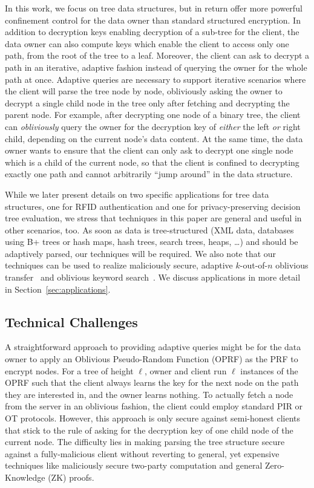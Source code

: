 In this work, we focus on tree data structures, but in return offer
more powerful confinement control for the data owner than standard
structured encryption.  In addition to decryption keys enabling
decryption of a sub-tree for the client, the data owner can also
compute keys which enable the client to access only one path, from the
root of the tree to a leaf.  Moreover, the client can ask to decrypt a
path in an iterative, adaptive fashion instead of querying the owner
for the whole path at once. Adaptive queries are necessary to support
iterative scenarios where the client will parse the tree node by node,
obliviously asking the owner to decrypt a single child node in the
tree only after fetching and decrypting the parent node.  For example,
after decrypting one node of a binary tree, the client can
\emph{obliviously} query the owner for the decryption key of
\emph{either} the left \emph{or} right child, depending on the current
node's data content.  At the same time, the data owner wants to ensure
that the client can only ask to decrypt one single node which is a
child of the current node, so that the client is confined to
decrypting exactly one path and cannot arbitrarily ``jump around'' in
the data structure.

 While we later present details on two specific applications for tree data structures, one for
RFID authentication and one for privacy-preserving decision tree
evaluation, we stress that techniques in this paper are general and
useful in other scenarios, too. As soon as data is tree-structured
(XML data, databases using B+ trees or hash maps, hash trees, search
trees, heaps, \ldots) and should be adaptively parsed, our techniques
will be required. We also note that our techniques can be used to
realize maliciously secure, adaptive $k$-out-of-$n$ oblivious
transfer~\cite{adaptiveot} and oblivious keyword search~\cite{oks}. We
discuss applications in more detail in Section~\ref{sec:applications}.

\subsection{Technical Challenges} A straightforward approach to
providing adaptive queries might be for the data owner to apply an
Oblivious Pseudo-Random Function (OPRF) as the PRF to encrypt nodes.
For a tree of height $\ell$, owner and client run $\ell$ instances of
the OPRF such that the client always learns the key for the next node
on the path they are interested in, and the owner learns nothing. To
actually fetch a node from the server in an oblivious fashion, the
client could employ standard PIR or OT protocols. However, this
approach is only secure against semi-honest clients that stick to the
rule of asking for the decryption key of one child node of the current
node. The difficulty lies in making parsing the tree structure secure
against a fully-malicious client without reverting to general, yet
expensive techniques like maliciously secure two-party computation and
general Zero-Knowledge (ZK) proofs.

